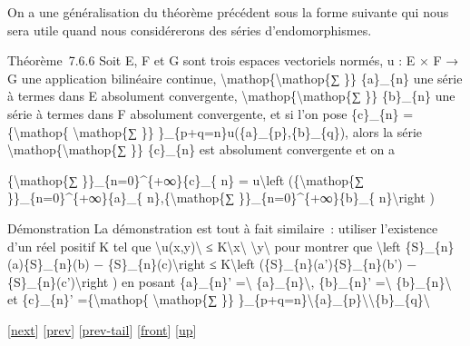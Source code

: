 \documentclass[]{article}
\begin{document}
On a une généralisation du théorème précédent sous la forme suivante qui
nous sera utile quand nous considérerons des séries d'endomorphismes.

Théorème~7.6.6 Soit E, F et G sont trois espaces vectoriels normés, u :
E × F → G une application bilinéaire continue,
\textbackslash{}mathop\{\textbackslash{}mathop\{∑ \}\} \{a\}\_\{n\} une
série à termes dans E absolument convergente,
\textbackslash{}mathop\{\textbackslash{}mathop\{∑ \}\} \{b\}\_\{n\} une
série à termes dans F absolument convergente, et si l'on pose
\{c\}\_\{n\} =\{\textbackslash{}mathop\{ \textbackslash{}mathop\{∑ \}\}
\}\_\{p+q=n\}u(\{a\}\_\{p\},\{b\}\_\{q\}), alors la série
\textbackslash{}mathop\{\textbackslash{}mathop\{∑ \}\} \{c\}\_\{n\} est
absolument convergente et on a

\{\textbackslash{}mathop\{∑ \}\}\_\{n=0\}\^{}\{+∞\}\{c\}\_\{ n\} =
u\textbackslash{}left (\{\textbackslash{}mathop\{∑
\}\}\_\{n=0\}\^{}\{+∞\}\{a\}\_\{ n\},\{\textbackslash{}mathop\{∑
\}\}\_\{n=0\}\^{}\{+∞\}\{b\}\_\{ n\}\textbackslash{}right )

Démonstration La démonstration est tout à fait similaire~: utiliser
l'existence d'un réel positif K tel que
\textbackslash{}\textbar{}u(x,y)\textbackslash{}\textbar{} ≤
K\textbackslash{}\textbar{}x\textbackslash{}\textbar{}
\textbackslash{}\textbar{}y\textbackslash{}\textbar{} pour montrer que
\textbackslash{}left \textbar{}\{S\}\_\{n\}(a)\{S\}\_\{n\}(b) −
\{S\}\_\{n\}(c)\textbackslash{}right \textbar{}≤ K\textbackslash{}left
(\{S\}\_\{n\}(a')\{S\}\_\{n\}(b') −
\{S\}\_\{n\}(c')\textbackslash{}right ) en posant \{a\}\_\{n\}'
=\textbackslash{}\textbar{} \{a\}\_\{n\}\textbackslash{}\textbar{},
\{b\}\_\{n\}' =\textbackslash{}\textbar{}
\{b\}\_\{n\}\textbackslash{}\textbar{} et \{c\}\_\{n\}'
=\{\textbackslash{}mathop\{ \textbackslash{}mathop\{∑ \}\}
\}\_\{p+q=n\}\textbackslash{}\textbar{}\{a\}\_\{p\}\textbackslash{}\textbar{}\textbackslash{}\textbar{}\{b\}\_\{q\}\textbackslash{}\textbar{}

{[}\href{coursse41.html}{next}{]} {[}\href{coursse39.html}{prev}{]}
{[}\href{coursse39.html\#tailcoursse39.html}{prev-tail}{]}
{[}\href{coursse40.html}{front}{]}
{[}\href{coursch8.html\#coursse40.html}{up}{]}
\end{document}
